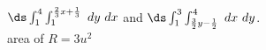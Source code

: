 {\noindent \begin{minipage}{\linewidth}
\end{minipage}
}
{$\ds\int_1^4\int_{1}^{\frac23x+\frac13}\ dy\ dx$ and $\ds\int_{1}^3\int_{\frac32y-\frac12}^4\ dx\ dy$.\\
area  of $R = 3u^2$
}
